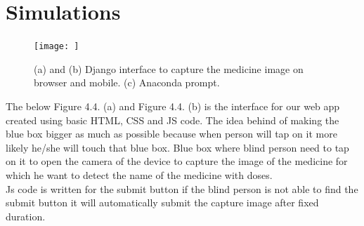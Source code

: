 \section{Simulations}
\begin{figure}[h!]
	\centering
	\texttt{[image: ]}
	\caption{(a) and (b) Django interface to capture the medicine image on browser and mobile. (c) Anaconda prompt. }
\end{figure}
\noindent The below Figure 4.4. (a) and Figure 4.4. (b) is the interface for our web app created using basic HTML, CSS and JS code. The idea behind of making the blue box bigger as much as possible because when person will tap on it more likely he/she will touch that blue box. Blue box where blind person need to tap on it  to open the camera of the device to capture the image of the medicine for which he want to detect the name of the medicine with doses.\\Js code is written for the submit button if the blind person is not able to find the submit button it will automatically submit the capture image after fixed duration.
\\
\newpage

